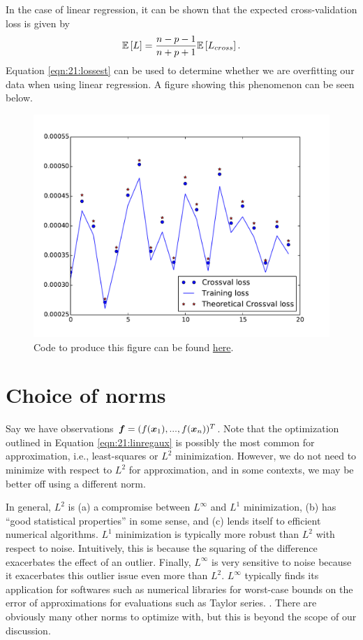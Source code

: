 In the case of linear regression, it can be shown that the expected cross-validation loss is given by
\begin{align} \label{eqn:21:lossest}
\mathbb{E}\left[L\right] = \frac{n-p-1}{n+p+1} \mathbb{E}\left[L_{cross}\right].
\end{align}
Equation \eqref{eqn:21:lossest} can be used to determine whether we are overfitting our data when using linear regression. A figure showing this phenomenon can be seen below.
\begin{figure}
    \centering
    \includegraphics[width=\textwidth]{images/linreg-crossval.pdf}
    \caption{Code to produce this figure can be found \href{https://github.com/tmasthay/MathModeling/tree/main/lectures/lecture21}{here}.}
    \label{fig:21:crossval}
\end{figure}

\section{Choice of norms}
Say we have observations $\boldsymbol{f} = (f(\boldsymbol{x}_1),...,f(\boldsymbol{x}_n))^{T}$. Note that the optimization outlined in Equation \eqref{eqn:21:linregaux} is possibly the most common for approximation, i.e., least-squares or $L^2$ minimization.
However, we do not need to minimize with respect to $L^2$ for approximation, and in some contexts, we may be better off using a different norm. 

In general, $L^2$ is (a) a compromise between $L^{\infty}$ and $L^{1}$ minimization, (b) has ``good statistical properties'' in some sense, and (c) lends itself to efficient numerical algorithms. $L^1$ minimization is typically more robust than $L^2$ with respect to noise. Intuitively, this is because the squaring of the difference exacerbates the effect of an outlier. Finally, $L^{\infty}$ is very sensitive to noise because it exacerbates this outlier issue even more than $L^2$. $L^{\infty}$ typically finds its application for softwares such as numerical libraries for worst-case bounds on the error of approximations for evaluations such as Taylor series. . There are obviously many other norms to optimize with, but this is beyond the scope of our discussion.

